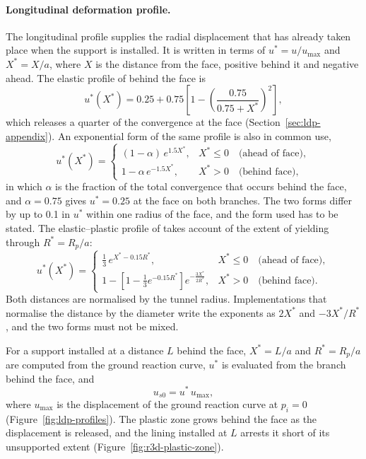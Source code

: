 \paragraph{Longitudinal deformation profile.}
The longitudinal profile supplies the radial displacement that has already
taken place when the support is installed. It is written in terms of
$u^* = u/u_{\max}$ and $X^* = X/a$, where $X$ is the distance from the face,
positive behind it and negative ahead. The elastic profile of
\citet{panet1995ccm} behind the face is
\[
u^*(X^*) = 0.25 + 0.75\left[1-\left(\frac{0.75}{0.75+X^*}\right)^{2}\right] ,
\]
which releases a quarter of the convergence at the face
(Section~\ref{sec:ldp-appendix}). An exponential form of the same profile is
also in common use,
\[
u^*(X^*) =
\begin{cases}
(1 - \alpha)\,e^{1.5X^*}, & X^* \leq 0 \quad \text{(ahead of face)},\\[4pt]
1 - \alpha\,e^{-1.5X^*}, & X^* > 0 \quad \text{(behind face)},
\end{cases}
\]
in which $\alpha$ is the fraction of the total convergence that occurs behind
the face, and $\alpha = 0.75$ gives $u^* = 0.25$ at the face on both
branches. The two forms differ by up to 0.1 in $u^*$
within one radius of the face, and the form used has to be stated. The
elastic--plastic
profile of \citet{vlachopoulos2009ldp} takes account of the extent of
yielding through $R^* = R_p/a$:
\[
u^*(X^*) =
\begin{cases}
\frac{1}{3}\, e^{X^* - 0.15R^*}, & X^* \leq 0 \quad \text{(ahead of face)},\\[4pt]
1 - \left[1 - \frac{1}{3} e^{-0.15R^*}\right] e^{-\frac{3X^*}{2R^*}}, & X^* > 0 \quad \text{(behind face)}.
\end{cases}
\]
Both distances are normalised by the tunnel radius. Implementations that
normalise the distance by the diameter write the exponents as $2X^*$ and
$-3X^*/R^*$, and the two forms must not be mixed.

For a support installed at a distance $L$ behind the face, $X^* = L/a$ and
$R^* = R_p/a$ are computed from the ground reaction curve, $u^*$ is evaluated
from the branch behind the face, and
\[
u_{s0} = u^*\,u_{\max} ,
\]
where $u_{\max}$ is the displacement of the ground reaction curve at
$p_i = 0$ (Figure~\ref{fig:ldp-profiles}). The plastic zone grows behind the
face as the displacement is released, and the lining installed at $L$ arrests
it short of its unsupported extent (Figure~\ref{fig:r3d-plastic-zone}).

